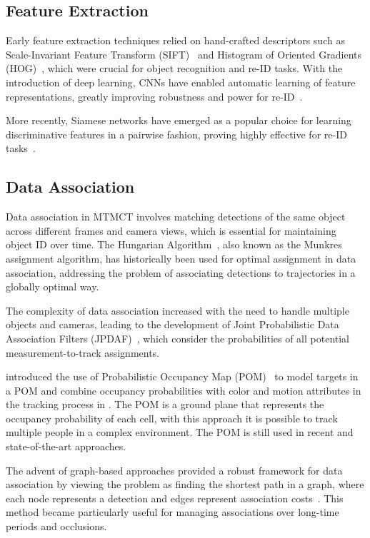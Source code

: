 \subsection{Feature Extraction}\label{subsec:milestone:eature_extraction}
Early feature extraction techniques relied on hand-crafted descriptors such as Scale-Invariant Feature Transform (SIFT)~\cite{Lowe04} and Histogram of Oriented Gradients (HOG)~\cite{Dalal05}, which were crucial for object recognition and re-ID tasks. With the introduction of deep learning, CNNs have enabled automatic learning of feature representations, greatly improving robustness and power for re-ID~\cite{Krizhevsky12, He16}.

More recently, Siamese networks have emerged as a popular choice for learning discriminative features in a pairwise fashion, proving highly effective for re-ID tasks~\cite{Varior16}.

\subsection{Data Association}\label{subsec:milestone_data_association}
Data association in MTMCT involves matching detections of the same object across different frames and camera views, which is essential for maintaining object ID over time. The Hungarian Algorithm~\cite{Kuhn55}, also known as the Munkres assignment algorithm, has historically been used for optimal assignment in data association, addressing the problem of associating detections to trajectories in a globally optimal way.

The complexity of data association increased with the need to handle multiple objects and cameras, leading to the development of Joint Probabilistic Data Association Filters (JPDAF)~\cite{Fortmann83}, which consider the probabilities of all potential measurement-to-track assignments.

\citeauthor{Fleuret08} introduced the use of Probabilistic Occupancy Map (POM)~\cite{Fleuret08} to model targets in a POM and combine occupancy probabilities with color and motion attributes in the tracking process in \citeyear{Fleuret08}. The POM is a ground plane that represents the occupancy probability of each cell, with this approach it is possible to track multiple people in a complex environment. The POM is still used in recent and state-of-the-art approaches.

The advent of graph-based approaches provided a robust framework for data association by viewing the problem as finding the shortest path in a graph, where each node represents a detection and edges represent association costs~\cite{Zhang08}. This method became particularly useful for managing associations over long-time periods and occlusions.

